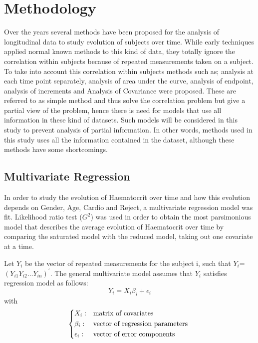 \documentclass[11pt]{article}
\begin{document}
\section{Methodology}

\noindent  Over the years several methods have been proposed for the analysis of longitudinal data to study evolution of subjects over time. While early techniques applied normal known methods to this kind of data, they totally ignore the correlation within subjects because of repeated measurements taken on a subject. To take into account this correlation within subjects methods such as; analysis at each time point separately, analysis of area under the curve, analysis of endpoint, analysis of increments and Analysis of Covariance \cite{bib8} were proposed. These are referred to as simple method and thus solve the correlation problem but give a partial view of the problem, hence there is need for models that use all information in these kind of datasets. Such models will be considered in this study to prevent analysis of partial information. In other words, methods used in this study uses all the information contained in the dataset, although these methods have some shortcomings.

\subsection{Multivariate Regression}

In order to study the evolution of Haematocrit over time and how this evolution depends on Gender, Age, Cardio and Reject, a multivariate regression model was fit. Likelihood ratio test ($G^2$) was used in order to obtain the most parsimonious model that describes the average evolution of Haematocrit over time by comparing the saturated model with the reduced model, taking out one covariate at a time.

\noindent Let $Y_i$ be the vector of repeated measurements for the subject i, such that  $Y_i$= $(Y_{i1} Y_{i2} \ldots Y_{in} )^{'}$. The general multivariate model assumes that $Y_i$ satisfies regression model as follows:
\begin{equation}\label{model1}
Y_{i}=X_{i}\beta_{i}+\epsilon_{i}
\end{equation}
with 
\[ \begin{dcases*} X_{i}: & matrix of covariates\\ 
\beta_{i}: & vector of regression parameters \\ 
\epsilon_{i}:  &  vector of error components 
\end{dcases*}  \]
\end{document}
